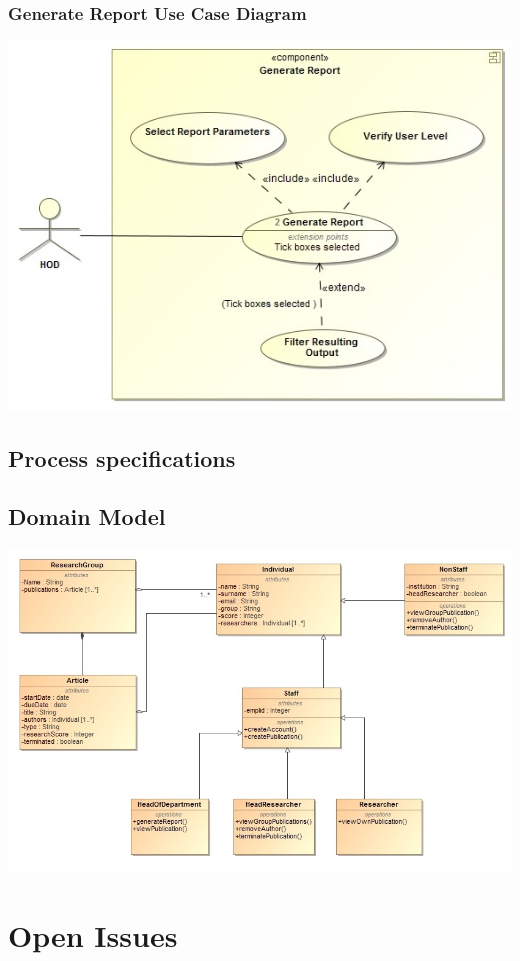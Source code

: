\documentclass[a4paper,12pt]{article}
\begin{document}
	\subsubsection{Generate Report Use Case Diagram}
	\includegraphics[width=1\textwidth]{./GenerateReport.jpg}\\[1.5cm]
		
\subsection{Process specifications}
\subsection{Domain Model}
	\includegraphics[width=1\textwidth]{./Domain.jpg}\\[1.5cm]
\newpage
\section{Open Issues}
\end{document}
